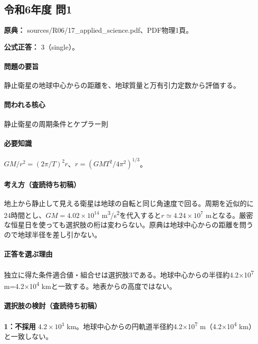 \subsection{令和6年度 問1}
\label{q:r06-reg-applied-01}

\noindent\textbf{原典：} sources/R06/17\_applied\_science.pdf、PDF物理1頁。

\textbf{公式正答：} 3（single）。

\paragraph{問題の要旨} 静止衛星の地球中心からの距離を、地球質量と万有引力定数から評価する。

\paragraph{問われる核心} 静止衛星の周期条件とケプラー則

\paragraph{必要知識} \(GM/r^2=(2\pi/T)^2r\)、\(r=(GMT^2/4\pi^2)^{1/3}\)。

\paragraph{考え方（査読待ち初稿）} 地上から静止して見える衛星は地球の自転と同じ角速度で回る。周期を近似的に24時間とし、\(GM=4.02\times10^{14}\) m\textsuperscript{3}/s\textsuperscript{2}を代入すると\(r\simeq4.24\times10^7\) mとなる。厳密な恒星日を使っても選択肢の桁は変わらない。原典は地球中心からの距離を問うので地球半径を差し引かない。

\paragraph{正答を選ぶ理由} 独立に得た条件適合値・組合せは選択肢3である。地球中心からの半径約4.2×10\textsuperscript{7} m=\allowbreak{}4.2×10\textsuperscript{4} kmと一致する。地表からの高度ではない。

\paragraph{選択肢の検討（査読待ち初稿）}\mbox{}\par

\noindent\textbf{1：不採用} \(4.2\times10^3\) km。地球中心からの円軌道半径約4.2×10\textsuperscript{7} m（4.2×10\textsuperscript{4} km）と一致しない。\par

